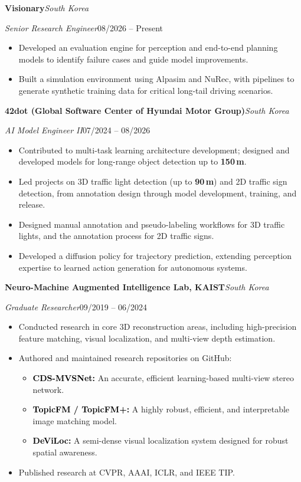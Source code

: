 \documentclass[11pt,a4paper]{article}
\newcommand{\kw}[1]{\textbf{\textcolor{black}{#1}}}
\newcommand{\entry}[2]{\noindent\textbf{#1}\hfill\textit{#2}\par}
\newcommand{\subentry}[2]{\noindent\textit{#1}\hfill #2\par\vspace{2pt}}
\begin{document}
\entry{Visionary}{South Korea}
\subentry{Senior Research Engineer}{08/2026 -- Present}
\begin{itemize}
    \item Developed an evaluation engine for perception and end-to-end planning models
          to identify failure cases and guide model improvements.
    \item Built a simulation environment using Alpasim and NuRec,
          with pipelines to generate synthetic training data for critical long-tail driving scenarios.
\end{itemize}
\vspace{4pt}

\entry{42dot (Global Software Center of Hyundai Motor Group)}{South Korea}
\subentry{AI Model Engineer II}{07/2024 -- 08/2026}
\begin{itemize}
    \item Contributed to multi-task learning architecture development;
          designed and developed models for long-range object detection up to \textbf{150\,m}.
    \item Led projects on 3D traffic light detection
          (up to \textbf{90\,m}) and 2D traffic sign detection, from annotation design through
          model development, training, and release.
    \item Designed manual annotation and pseudo-labeling workflows
          for 3D traffic lights, and the annotation process for 2D traffic signs.
    \item Developed a diffusion policy for trajectory prediction,
          extending perception expertise to learned action generation for autonomous systems.
\end{itemize}
\vspace{4pt}

\entry{Neuro-Machine Augmented Intelligence Lab, KAIST}{South Korea}
\subentry{Graduate Researcher}{09/2019 -- 06/2024}
\begin{itemize}
    \item Conducted research in core 3D reconstruction areas,
          including high-precision feature matching, visual localization, and multi-view depth estimation.
    \item Authored and maintained research repositories on GitHub:
    \begin{itemize}
        \item \kw{CDS-MVSNet:} An accurate, efficient learning-based multi-view stereo network.
        \item \kw{TopicFM / TopicFM+:} A highly robust, efficient, and interpretable image matching model.
        \item \kw{DeViLoc:} A semi-dense visual localization system designed for robust spatial awareness.
    \end{itemize}
    \item Published research at CVPR, AAAI, ICLR, and IEEE TIP.
\end{itemize}
\vspace{4pt}
\end{document}
